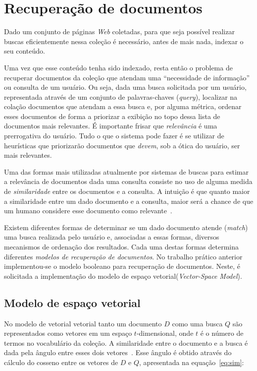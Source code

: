 \documentclass[10pt,twocolumn]{article}
\begin{document}
\section{Recuperação de documentos}\label{sec:retrieval}

Dado um conjunto de páginas \emph{Web} coletadas, para que seja possível
realizar buscas eficientemente nessa coleção é necessário, antes de mais
nada, indexar o seu conteúdo.

Uma vez que esse conteúdo tenha sido indexado, resta então o problema
de recuperar documentos da coleção que atendam uma ``necessidade de
informação'' ou consulta de um usuário. Ou seja, dada uma busca solicitada por um
usuário, representada através de um
conjunto de palavras-chaves (\emph{query}), localizar na colação
documentos que atendam a essa busca e, por alguma métrica, ordenar esses
documentos de forma a priorizar a exibição no topo dessa lista de
documentos mais relevantes. É importante frisar que
\emph{relevância} é uma prerrogativa do usuário. Tudo o que o sistema
pode fazer é se utilizar de heurísticas que priorizarão documentos que
\emph{devem}, sob a ótica do usuário, ser mais relevantes.

Uma das formas mais utilizadas atualmente por sistemas de buscas para
estimar a relevância de documentos dada uma consulta consiste no uso de
alguma medida de \emph{similaridade} entre os documentos e a consulta. A
intuição é que quanto maior a similaridade entre um dado documento e a
consulta, maior será a chance de que um humano considere esse documento
como relevante~\cite{moffat2006survey}.

Existem diferentes formas de determinar se um dado documento
atende (\emph{match}) uma busca  realizada pelo usuário e, associadas a
essas formas, diversos mecanismos de ordenação dos resultados. Cada uma
destas formas determina diferentes \emph{modelos de recuperação de
documentos}. No trabalho prático anterior implementou-se o modelo
booleano para recuperação de documentos. Neste, é solicitada a
implementação do modelo de espaço vetorial(\emph{Vector-Space Model}).

\subsection{Modelo de espaço vetorial}

No modelo de vetorial vetorial tanto um documento \(D\) como uma busca
\(Q\) são representados como vetores em um espaço \(t\)-dimensional,
onde \(t\) é o número de termos no vocabulário da coleção. A
similaridade entre o documento e a busca é dada pela ângulo entre esses
dois vetores~\cite{berthier1999modern}.
Esse ângulo é obtido através do cálculo do cosseno entre
os vetores de \(D\) e \(Q\), apresentada na equação~\ref{eq:sim}:
\end{document}
